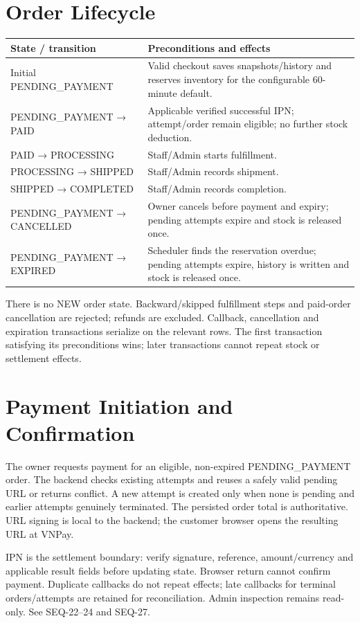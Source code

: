 \section{Order Lifecycle}
\begin{tabularx}{\textwidth}{@{}p{54mm}X@{}}
\toprule
State / transition & Preconditions and effects \\
\midrule
Initial PENDING\_PAYMENT & Valid checkout saves snapshots/history and reserves inventory for the configurable 60-minute default. \\
PENDING\_PAYMENT → PAID & Applicable verified successful IPN; attempt/order remain eligible; no further stock deduction. \\
PAID → PROCESSING & Staff/Admin starts fulfillment. \\
PROCESSING → SHIPPED & Staff/Admin records shipment. \\
SHIPPED → COMPLETED & Staff/Admin records completion. \\
PENDING\_PAYMENT → CANCELLED & Owner cancels before payment and expiry; pending attempts expire and stock is released once. \\
PENDING\_PAYMENT → EXPIRED & Scheduler finds the reservation overdue; pending attempts expire, history is written and stock is released once. \\
\bottomrule
\end{tabularx}

There is no NEW order state. Backward/skipped fulfillment steps and paid-order cancellation are rejected; refunds are excluded. Callback, cancellation and expiration transactions serialize on the relevant rows. The first transaction satisfying its preconditions wins; later transactions cannot repeat stock or settlement effects.

\section{Payment Initiation and Confirmation}
The owner requests payment for an eligible, non-expired PENDING\_PAYMENT order. The backend checks existing attempts and reuses a safely valid pending URL or returns conflict. A new attempt is created only when none is pending and earlier attempts genuinely terminated. The persisted order total is authoritative. URL signing is local to the backend; the customer browser opens the resulting URL at VNPay.

IPN is the settlement boundary: verify signature, reference, amount/currency and applicable result fields before updating state. Browser return cannot confirm payment. Duplicate callbacks do not repeat effects; late callbacks for terminal orders/attempts are retained for reconciliation. Admin inspection remains read-only. See SEQ-22--24 and SEQ-27.

